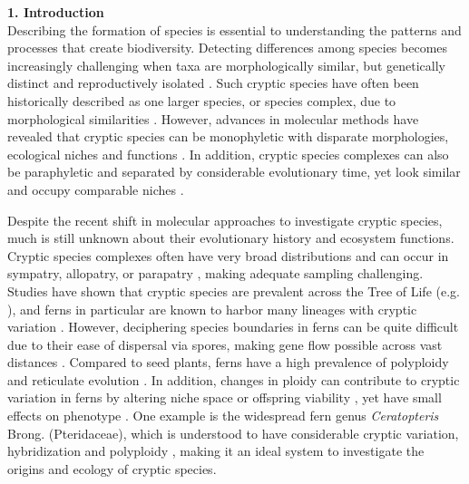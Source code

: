 \documentclass[12pt]{article}
\begin{document}
\begin{flushleft}
{\large\textbf{1. Introduction}}\\

Describing the formation of species is essential to understanding the patterns and processes that create biodiversity. Detecting differences among species becomes increasingly challenging when taxa are morphologically similar, but genetically distinct and reproductively isolated \autocite{Bickford2007, Masuyama1992, Paris1989}. Such cryptic species have often been historically described as one larger species, or species complex, due to morphological similarities \autocite{Paris1989}. However, advances in molecular methods have revealed that cryptic species can be monophyletic with disparate morphologies, ecological niches and functions \autocite{Amato2007, Hebert2004, Sattler2007, Southgate2019}. In addition, cryptic species complexes can also be paraphyletic and separated by considerable evolutionary time, yet look similar and occupy comparable niches \autocite{Amor2014, Cunnington2005}. 

Despite the recent shift in molecular approaches to investigate cryptic species, much is still unknown about their evolutionary history and ecosystem functions. Cryptic species complexes often have very broad distributions \autocite{Der2009, Knowlton1993, Nygren2014} and can occur in sympatry, allopatry, or parapatry \autocite{Bickford2007}, making adequate sampling challenging. Studies have shown that cryptic species are prevalent across the Tree of Life (e.g. \cite{Bickford2007, Del_Carmen_Molina2011, Hebert2004, Nygren2014}), and ferns in particular are known to harbor many lineages with cryptic variation \autocite{Adjie2007, Paris1989, Yatabe2009}. However, deciphering species boundaries in ferns can be quite difficult due to their ease of dispersal via spores, making gene flow possible across vast distances \autocite{Barrington1993, Tryon1970}. Compared to seed plants, ferns have a high prevalence of polyploidy and reticulate evolution \autocite{Barrington1989, Paris1989, Sigel2016, Otto2000}. In addition, changes in ploidy can contribute to cryptic variation in ferns by altering niche space or offspring viability \autocite{Otto2007, Southgate2019, Masuyama2002}, yet have small effects on phenotype \autocite{Patel2019}. One example is the widespread fern genus \textit{Ceratopteris} Brong. (Pteridaceae), which is understood to have considerable cryptic variation, hybridization and polyploidy \autocite{Adjie2007, LloydTax1974, Masuyama2010}, making it an ideal system to investigate the origins and ecology of cryptic species.


\end{flushleft}
\end{document}
